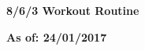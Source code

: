 \documentclass{article}%
\begin{document}
%
\normalsize%
\pagestyle{header}%
\begin{minipage}{\textwidth}%
\centering%
\begin{Large}%
\textbf{8/6/3 Workout Routine}%
\end{Large}%
\linebreak%
\begin{large}%
\textbf{As of: 24/01/2017}%
\end{large}%
\end{minipage}%
\end{document}
